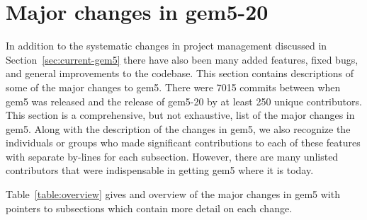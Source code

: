 \section{Major changes in gem5-20}
\label{sec:changes}

In addition to the systematic changes in project management discussed in Section~\ref{sec:current-gem5} there have also been many added features, fixed bugs, and general improvements to the codebase.
This section contains descriptions of some of the major changes to gem5.
There were 7015 commits between when gem5 was released and the release of gem5-20 by at least 250 unique contributors.
This section is a comprehensive, but not exhaustive, list of the major changes in gem5.
Along with the description of the changes in gem5, we also recognize the individuals or groups who made significant contributions to each of these features with separate by-lines for each subsection.
However, there are many unlisted contributors that were indispensable in getting gem5 where it is today.

Table~\ref{table:overview} gives and overview of the major changes in gem5 with pointers to subsections which contain more detail on each change.

